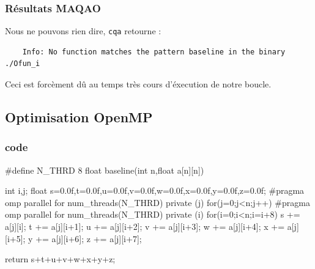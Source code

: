 \documentclass{report}
\begin{document}
  \subsubsection{Résultats MAQAO}
  Nous ne pouvons rien dire, \texttt{cqa} retourne :
  \begin{verbatim}
    Info: No function matches the pattern baseline in the binary ./Ofun_i
  \end{verbatim}
  Ceci est forcèment dû au temps très cours d'éxecution de notre boucle.
  \subsection{Optimisation OpenMP}
  \subsubsection{code}
  \begin{cc}
    #define N_THRD 8
    float baseline(int n,float a[n][n])
    {
        int i,j;
        float s=0.0f,t=0.0f,u=0.0f,v=0.0f,w=0.0f,x=0.0f,y=0.0f,z=0.0f;
        #pragma omp parallel for num_threads(N_THRD) private (j)
        for(j=0;j<n;j++)
          #pragma omp parallel for num_threads(N_THRD) private (i)
          for(i=0;i<n;i=i+8)
          {
                s += a[j][i];
                t += a[j][i+1];
                u += a[j][i+2];
                v += a[j][i+3];
                w += a[j][i+4];
                x += a[j][i+5];
                y += a[j][i+6];
                z += a[j][i+7];
          }

        return s+t+u+v+w+x+y+z;
    }
  \end{cc}
\end{document}
